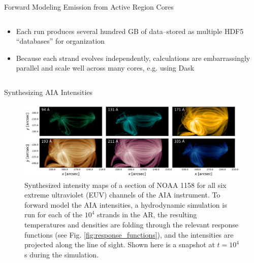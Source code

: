 \documentclass[final]{beamer}
\begin{document}
\begin{frame}
\begin{columns}[T]
\begin{column}{0.49\linewidth}
\begin{block}{Forward Modeling Emission from Active Region Cores}
\begin{columns}[T]
\begin{column}{0.49\columnwidth}
\begin{itemize}
\begin{enumerate}
                    \item Map temperature and density from each strand into the extrapolated field such that we have temperature and density in time and 3D cartesian space, $T(x,y,z,t)$ and $n(x,y,z,t)$
                    \item At each timestep, calculate the intensity in each EUV channel, $c$, using the AIA response functions (see Fig. \ref{fig:response_functions}) and taking the LOS to be along the $z$-axis,
                    \begin{equation}
                        I_c(x,y,t) = \int\mathrm{d}z\,n^2(x,y,z,t)K_c(T(x,y,z,t)),
                    \end{equation}
                    where $K_c$ is the temperture response function of channel $c$.
                    \item Apply a gaussian filter to each synthesized image to simulate the point spread function of the instrument
                \end{enumerate}
                \item Each run produces several hundred GB of data--stored as multiple HDF5 ``databases'' for organization
                \item Because each strand evolves independently, calculations are embarrassingly parallel and scale well across many cores, e.g. using Dask \citep{dask_development_team_dask:_2016}
            \end{itemize}
        \end{column}
    \end{columns}
    \end{block}
    \begin{block}{Synthesizing AIA Intensities}
        \begin{figure}
            \includegraphics[width=\columnwidth]{figures/aia_intensities.pdf}
            \caption{Synthesized intensity maps of a section of NOAA 1158 for all six extreme ultraviolet (EUV) channels of the AIA instrument. To forward model the AIA intensities, a hydrodynamic simulation is run for each of the $10^4$ strands in the AR, the resulting temperatures and densities are folding through the relevant response functions (see Fig. \ref{fig:response_functions}), and the intensities are projected along the line of sight. Shown here is a snapshot at $t=10^4$ s during the simulation.} 

\end{figure}
\end{block}
\end{column}
\end{columns}
\end{frame}
\end{document}
